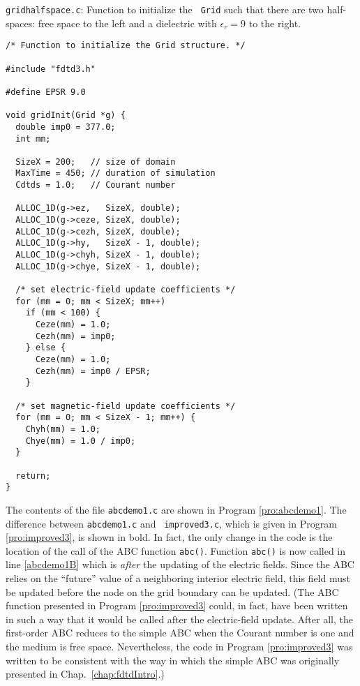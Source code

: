 \begin{program} {\tt gridhalfspace.c}: Function to initialize the {\tt
    Grid} such that there are two half-spaces: free space to the left
  and a dielectric with $\epsilon_r=9$ to the right.
\label{pro:gridInit1DhalfSpace}
\codemiddle
\begin{lstlisting}
/* Function to initialize the Grid structure. */

#include "fdtd3.h"

#define EPSR 9.0

void gridInit(Grid *g) {
  double imp0 = 377.0;
  int mm;

  SizeX = 200;   // size of domain
  MaxTime = 450; // duration of simulation
  Cdtds = 1.0;   // Courant number

  ALLOC_1D(g->ez,   SizeX, double);
  ALLOC_1D(g->ceze, SizeX, double);
  ALLOC_1D(g->cezh, SizeX, double);
  ALLOC_1D(g->hy,   SizeX - 1, double);
  ALLOC_1D(g->chyh, SizeX - 1, double);
  ALLOC_1D(g->chye, SizeX - 1, double);
  
  /* set electric-field update coefficients */
  for (mm = 0; mm < SizeX; mm++)
    if (mm < 100) {
      Ceze(mm) = 1.0;
      Cezh(mm) = imp0;
    } else {
      Ceze(mm) = 1.0;
      Cezh(mm) = imp0 / EPSR;
    }

  /* set magnetic-field update coefficients */
  for (mm = 0; mm < SizeX - 1; mm++) {
    Chyh(mm) = 1.0;
    Chye(mm) = 1.0 / imp0;
  }

  return;
}
\end{lstlisting}
\end{program}

The contents of the file {\tt abcdemo1.c} are shown in Program
\ref{pro:abcdemo1}.  The difference between {\tt abcdemo1.c} and {\tt
  improved3.c}, which is given in Program \ref{pro:improved3}, is
shown in bold.  In fact, the only change in the code is the location of
the call of the ABC function {\tt abc()}.  Function {\tt abc()} is now
called in line \ref{abcdemo1B} which is {\em after} the updating of
the electric fields.  Since the ABC relies on the ``future'' value of
a neighboring interior electric field, this field must be updated
before the node on the grid boundary can be updated.  (The ABC
function presented in Program \ref{pro:improved3} could, in fact, have
been written in such a way that it would be called after the
electric-field update.  After all, the first-order ABC reduces to the
simple ABC when the Courant number is one and the medium is free
space.  Nevertheless, the code in Program \ref{pro:improved3} was
written to be consistent with the way in which the simple ABC was
originally presented in Chap.\ \ref{chap:fdtdIntro}.)

